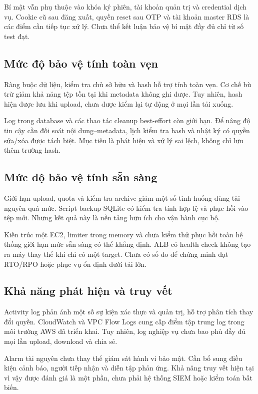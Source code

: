 Bí mật vẫn phụ thuộc vào khóa ký phiên, tài khoản quản trị và credential dịch vụ. Cookie cũ sau đăng xuất, quyền reset sau OTP và tài khoản master RDS là các điểm cần tiếp tục xử lý. Chưa thể kết luận bảo vệ bí mật đầy đủ chỉ từ số test đạt.
\subsection{Mức độ bảo vệ tính toàn vẹn}
Ràng buộc dữ liệu, kiểm tra chủ sở hữu và hash hỗ trợ tính toàn vẹn. Cơ chế bù trừ giảm khả năng tệp tồn tại khi metadata không ghi được. Tuy nhiên, hash hiện được lưu khi upload, chưa được kiểm lại tự động ở mọi lần tải xuống.

Log trong database và các thao tác cleanup best-effort còn giới hạn. Để nâng độ tin cậy cần đối soát nội dung--metadata, lịch kiểm tra hash và nhật ký có quyền sửa/xóa được tách biệt. Mục tiêu là phát hiện và xử lý sai lệch, không chỉ lưu thêm trường hash.
\subsection{Mức độ bảo vệ tính sẵn sàng}
Giới hạn upload, quota và kiểm tra archive giảm một số tình huống dùng tài nguyên quá mức. Script backup SQLite có kiểm tra tính hợp lệ và phục hồi vào tệp mới. Những kết quả này là nền tảng hữu ích cho vận hành cục bộ.

Kiến trúc một EC2, limiter trong memory và chưa kiểm thử phục hồi toàn hệ thống giới hạn mức sẵn sàng có thể khẳng định. ALB có health check không tạo ra máy thay thế khi chỉ có một target. Chưa có số đo để chứng minh đạt RTO/RPO hoặc phục vụ ổn định dưới tải lớn.
\subsection{Khả năng phát hiện và truy vết}
Activity log phản ánh một số sự kiện xác thực và quản trị, hỗ trợ phân tích thay đổi quyền. CloudWatch và VPC Flow Logs cung cấp điểm tập trung log trong môi trường AWS đã triển khai. Tuy nhiên, log nghiệp vụ chưa bao phủ đầy đủ mọi lần upload, download và chia sẻ.

Alarm tài nguyên chưa thay thế giám sát hành vi bảo mật. Cần bổ sung điều kiện cảnh báo, người tiếp nhận và diễn tập phản ứng. Khả năng truy vết hiện tại vì vậy được đánh giá là một phần, chưa phải hệ thống SIEM hoặc kiểm toán bất biến.

